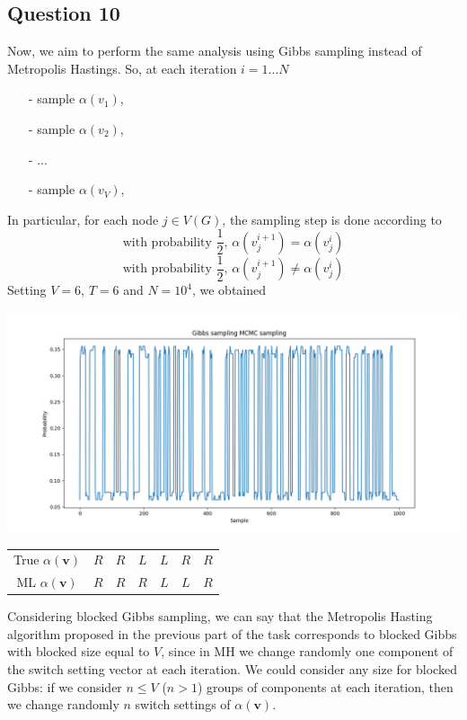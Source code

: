 \documentclass[]{article}
\begin{document}
	\subsection*{Question 10}
	Now, we aim to perform the same analysis using Gibbs sampling instead of Metropolis Hastings. So, at each iteration $i = 1...N$
	\begin{enumerate}
		\item[-] sample $\alpha(v_1)$, 
		\item[-] sample $\alpha(v_2)$,
		\item[-] ...
		\item[-] sample $\alpha(v_V)$,  
	\end{enumerate} 
	In particular, for each node $j \in V(G)$, the sampling step is done according to
	$$
	\text{with probability } \frac{1}{2} \text{, } \alpha(v_j^{i+1}) = \alpha(v_j^i)
	$$
	$$
	\text{with probability } \frac{1}{2} \text{, } \alpha(v_j^{i+1}) \neq \alpha(v_j^i)
	$$
	Setting $V=6$, $T=6$ and $N=10^4$, we obtained
	\begin{center}
		\includegraphics[width=\columnwidth]{task3/V_6_T_6_N_10000_Gibbs.png}
		\begin{tabular}{| c | c | c | c | c | c | c |}
			True $\alpha(\mathbf{v})$ & $R$ & $R$ & $L$ & $L$ & $R$ & $R$ \\
			ML $\alpha(\mathbf{v})$ & $R$ & $R$ & $R$ & $L$ & $L$ & $R$ \\
		\end{tabular}
	\end{center}
	Considering blocked Gibbs sampling, we can say that the Metropolis Hasting algorithm proposed in the previous part of the task corresponds to blocked Gibbs with blocked size equal to $V$, since in MH we change randomly one component of the switch setting vector at each iteration. We could consider any size for blocked Gibbs: if we consider $n \leq V$ ($n > 1$) groups of components at each iteration, then we change randomly $n$ switch settings of $\alpha(\mathbf{v})$.
	
\end{document}
